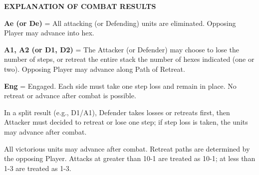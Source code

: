 \begin{strip}
\end{strip}

\begin{flushleft}
  \textbf{EXPLANATION OF COMBAT RESULTS}
\end{flushleft}

\textbf{Ae (or De)} = All attacking (or Defending) units are eliminated. Opposing Player may advance into hex.
\par
\textbf{A1, A2 (or D1, D2)} = The Attacker (or Defender) may choose to lose the number of steps, or retreat the entire stack the number of hexes indicated (one or two). Opposing Player may advance along Path of Retreat.
\par
\textbf{Eng} = Engaged. Each side must take one step loss and remain in place. No retreat or advance after combat is possible.
\par
In a split result (e.g., D1/A1), Defender takes losses or retreats first, then Attacker must decided to retreat or lose one step; if step loss is taken, the units may advance after combat.
\par
All victorious units may advance after combat. Retreat paths are determined by the opposing Player. Attacks at greater than 10-1 are treated as 10-1; at less than 1-3 are treated as 1-3.